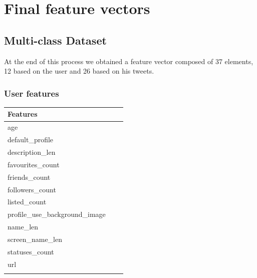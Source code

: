 \section{Final feature vectors}
\label{sec:feature_vector}

\subsection{Multi-class Dataset}
At the end of this process we obtained a feature vector composed of 37 elements, 12 based on the user and 26 based on his tweets.

\subsubsection{User features}


\small
\begin{center}
	\begin{tabular}{lll}
		\textbf{Features}\\
		\hline\hline
		age\\
		default\_profile\\
		description\_len\\
		favourites\_count\\
		friends\_count\\
		followers\_count\\
		listed\_count\\
		profile\_use\_background\_image\\
		name\_len\\
		screen\_name\_len\\
		statuses\_count\\
		url\\
		\hline\\
		
	\end{tabular}
\end{center}
\normalsize

